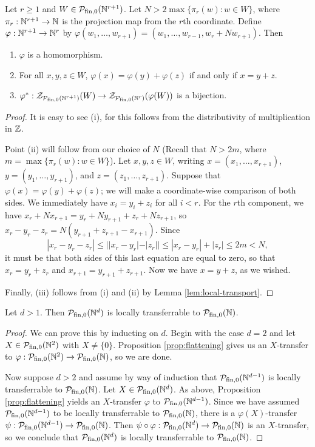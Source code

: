 \begin{prop}\label{prop:flattening}
	Let $r \ge 1$ and $W\in \mathcal{P}_{\textrm{fin}, 0}(\mathbb{N}^{r+1})$.
	Let $N > 2 \max\{\pi_r(w): w\in W\}$, where $\pi_r: \mathbb{N}^{r+1} \to \mathbb{N}$ is the projection map from the $r$th coordinate.
	Define $\varphi: \mathbb{N}^{r+1} \to \mathbb{N}^r$ by $\varphi(w_1,\dots, w_{r+1}) = (w_1,\dots, w_{r-1},w_r + N w_{r+1})$.
	Then
	\begin{enumerate}[label={\rm (\roman{*})}]
		\item $\varphi$ is a homomorphism.
		\item For all $x,y,z\in W$, $\varphi(x) = \varphi(y) + \varphi(z)$ if and only if $x = y + z$.
		\item $\varphi^*:\mathcal{Z}_{\mathcal{P}_{\textrm{fin}, 0}(\mathbb{N}^{r+1})}(W) \to \mathcal{Z}_{\mathcal{P}_{\textrm{fin}, 0}(\mathbb{N}^r)}(\varphi(W))$ is a bijection.
	\end{enumerate}
\end{prop}
\begin{proof}
	It is easy to see (i), for this follows from the distributivity of multiplication in $\mathbb{Z}$.
	
	Point (ii) will follow from our choice of $N$ (Recall that $N > 2m$, where $m = \max\{\pi_r(w): w\in W\}$).
	Let $x,y,z\in W$, writing $x = (x_1,\dots, x_{r+1})$, $y=(y_1,\dots,y_{r+1})$, and $z=(z_1,\dots,z_{r+1})$.
	Suppose that $\varphi(x) = \varphi(y) + \varphi(z)$; we will make a coordinate-wise comparison of both sides.
	We immediately have $x_i = y_i + z_i$ for all $i < r$.
	For the $r$th component, we have $x_r + Nx_{r+1} = y_r + Ny_{r+1} + z_r + Nz_{r+1}$, so
	$x_r -y_r - z_r = N(y_{r+1}+z_{r+1}-x_{r+1})$.
	Since 
	\[|x_r - y_r - z_r| \le | |x_r - y_r| - |z_r| | \le |x_r-y_r| + |z_r| \le 2m < N,\]
	it must be that both sides of this last equation are equal to zero, so that $x_r = y_r + z_r$ and $x_{r+1} = y_{r+1}+z_{r+1}$.
	Now we have $x = y+z$, as we wished.
	
	Finally, (iii) follows from (i) and (ii) by Lemma \ref{lem:local-transport}.
\end{proof}

\begin{thm}\label{thm:passage-to-Nd}
	Let $d > 1$. 
	Then $\mathcal{P}_{\textrm{fin}, 0}(\mathbb{N}^d)$ is locally transferrable to ${\mathcal{P}_{\textrm{fin},0}(\mathbb{N})}$.
\end{thm}
\begin{proof}
	We can prove this by inducting on $d$.
	Begin with the case $d=2$ and let $X\in \mathcal{P}_{\textrm{fin}, 0}(\mathbb{N}^2)$ with $X \neq \{0\}$.
	Proposition \ref{prop:flattening} gives us an $X$-transfer to $\varphi:\mathcal{P}_{\textrm{fin}, 0}(\mathbb{N}^2) \to {\mathcal{P}_{\textrm{fin},0}(\mathbb{N})}$, so we are done.
	
	Now suppose $d>2$ and assume by way of induction that $\mathcal{P}_{\textrm{fin}, 0}(\mathbb{N}^{d-1})$ is locally transferrable to ${\mathcal{P}_{\textrm{fin},0}(\mathbb{N})}$.
	Let $X\in \mathcal{P}_{\textrm{fin}, 0}(\mathbb{N}^{d})$.
	As above, Proposition \ref{prop:flattening} yields an $X$-transfer $\varphi$ to $\mathcal{P}_{\textrm{fin}, 0}(\mathbb{N}^{d-1})$.
	Since we have assumed $\mathcal{P}_{\textrm{fin}, 0}(\mathbb{N}^{d-1})$ to be locally transferrable to ${\mathcal{P}_{\textrm{fin},0}(\mathbb{N})}$, there is a $\varphi(X)$-transfer $\psi: \mathcal{P}_{\textrm{fin}, 0}(\mathbb{N}^{d-1}) \to {\mathcal{P}_{\textrm{fin},0}(\mathbb{N})}$.
	Then $\psi\circ\varphi: \mathcal{P}_{\textrm{fin}, 0}(\mathbb{N}^d) \to {\mathcal{P}_{\textrm{fin},0}(\mathbb{N})}$ is an $X$-transfer, so we conclude that $\mathcal{P}_{\textrm{fin}, 0}(\mathbb{N}^d)$ is locally transferrable to ${\mathcal{P}_{\textrm{fin},0}(\mathbb{N})}$.
\end{proof}


